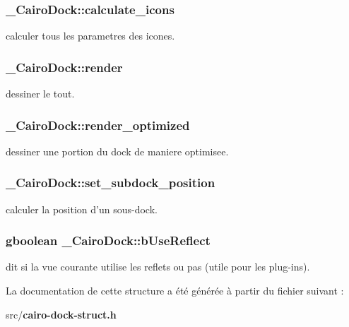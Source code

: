 \subsubsection{ {\bf \_\-CairoDock::calculate\_\-icons}}\label{struct__CairoDock_992cbda2e0f36045bbebfe5b2796fd75}


calculer tous les parametres des icones. 

\subsubsection{ {\bf \_\-CairoDock::render}}\label{struct__CairoDock_b80e203ce33cfbccf2c5d42531708782}


dessiner le tout. 

\subsubsection{ {\bf \_\-CairoDock::render\_\-optimized}}\label{struct__CairoDock_402e9bbf49b5b74866b90b41743d3e33}


dessiner une portion du dock de maniere optimisee. 

\subsubsection{ {\bf \_\-CairoDock::set\_\-subdock\_\-position}}\label{struct__CairoDock_98f2d017465563550de31aa4fe1f491d}


calculer la position d'un sous-dock. 

\subsubsection{\setlength{\rightskip}{0pt plus 5cm}gboolean {\bf \_\-CairoDock::bUseReflect}}\label{struct__CairoDock_fef9a496c9a10f1ef83c4a4a4f4c5cc3}


dit si la vue courante utilise les reflets ou pas (utile pour les plug-ins). 



La documentation de cette structure a été générée à partir du fichier suivant :\begin{CompactItemize}
\item 
src/{\bf cairo-dock-struct.h}\end{CompactItemize}
